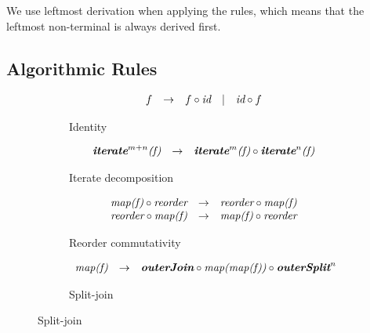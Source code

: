 We use leftmost derivation when applying the rules, which means that the leftmost non-terminal is always derived first.


\subsection{Algorithmic Rules}

\begin{figure}[t]
\centering
\begin{subfigure}[b]{1\linewidth}
\begin{mdframed}
$$
\begin{array}{lllll}
  f & \rightarrow & f \circ \textit{id} & | & \textit{id} \circ f\\
\end{array}
$$
\end{mdframed}
  \caption{Identity}
  \label{fig:algo:identity}
\end{subfigure}

\vspace{-0.5em}
\begin{subfigure}[b]{1\linewidth}
\begin{mdframed}
$$
\begin{array}{lrl}
  \textit{\textbf{iterate}}^{m+n}\textit{(f)} & \rightarrow & \textit{\textbf{iterate}}^m\textit{(f)} \circ \textit{\textbf{iterate}}^n\textit{(f)}\\
  \end{array}
$$
\end{mdframed}
  \caption{Iterate decomposition}
  \label{fig:algo:iterate}
\end{subfigure}

\vspace{-0.5em}
\begin{subfigure}[b]{1\linewidth}
\begin{mdframed}
$$
\begin{array}{lrl}
  \textit{map(f)} \circ \textit{reorder} & \rightarrow & \textit{reorder} \circ \textit{map(f)}\\
  \textit{reorder} \circ \textit{map(f)} & \rightarrow & \textit{map(f)} \circ \textit{reorder}\\  
\end{array}
$$
\end{mdframed}
  \caption{Reorder commutativity}
  \label{fig:algo:reorder}
\end{subfigure}

\vspace{-0.5em}
\begin{subfigure}[b]{1\linewidth}
\begin{mdframed}
$$
\begin{array}{lrl}
  \textit{map(f)} & \rightarrow & \textit{\textbf{outerJoin}} \circ \textit{map(map(f))}\circ \textit{\textbf{outerSplit}}^n
\end{array}
$$
\end{mdframed}
  \caption{Split-join}
  \label{fig:algo:splitjoin}
\end{subfigure}


\end{figure}
